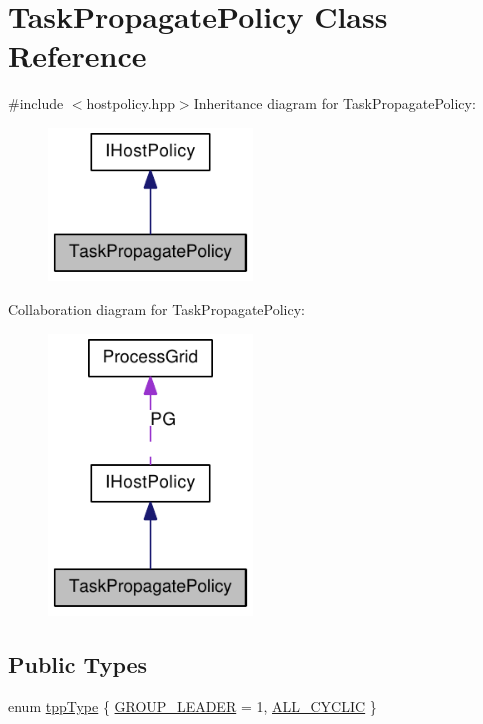 \hypertarget{class_task_propagate_policy}{
\section{TaskPropagatePolicy Class Reference}
\label{class_task_propagate_policy}
}


{\ttfamily \#include $<$hostpolicy.hpp$>$}Inheritance diagram for TaskPropagatePolicy:\nopagebreak
\begin{figure}[H]
\begin{center}
\leavevmode
\includegraphics[width=154pt]{class_task_propagate_policy__inherit__graph}
\end{center}
\end{figure}
Collaboration diagram for TaskPropagatePolicy:\nopagebreak
\begin{figure}[H]
\begin{center}
\leavevmode
\includegraphics[width=154pt]{class_task_propagate_policy__coll__graph}
\end{center}
\end{figure}
\subsection*{Public Types}
\begin{DoxyCompactItemize}
\item 
enum \hyperlink{class_task_propagate_policy_a6c683eb92ff5d4fb9ea0b083732c13fd}{tppType} \{ \hyperlink{class_task_propagate_policy_a6c683eb92ff5d4fb9ea0b083732c13fda2d48d7fee629a2535833a384ae1a30ad}{GROUP\_\-LEADER} = 1, 
\hyperlink{class_task_propagate_policy_a6c683eb92ff5d4fb9ea0b083732c13fda59cd907f4d363e9b2cb3f2b96baad3e9}{ALL\_\-CYCLIC}
 \}
\end{DoxyCompactItemize}
